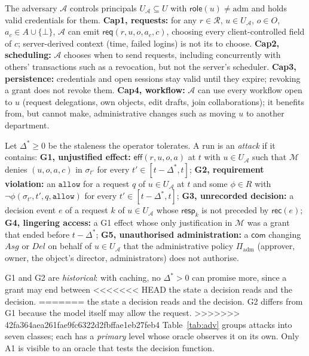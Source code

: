\documentclass[sigconf,review,anonymous]{acmart}
\newcommand{\role}{\mathsf{role}}
\newcommand{\allowv}{\mathtt{allow}}
\newcommand{\ev}[1]{\mathsf{#1}}
\newcommand{\Routes}{\mathcal{R}}
\begin{document}
\begin{definition}[Adversary]\label{def:adv}
The adversary $\mathcal{A}$ controls principals $U_{\mathcal{A}}\subseteq U$ with $\role(u)\neq\mathrm{adm}$ and
holds valid credentials for them. \textbf{Cap1, requests:} for any $r\in\Routes$, $u\in U_{\mathcal{A}}$, $o\in O$,
$a_c\in A\cup\{\bot\}$, $\mathcal{A}$ can emit $\ev{req}(r,u,o,a_c,c)$, choosing every client-controlled field of
$c$; server-derived context (time, failed logins) is not its to choose. \textbf{Cap2, scheduling:} $\mathcal{A}$
chooses when to send requests, including concurrently with others' transactions such as a revocation, but not the
server's scheduler. \textbf{Cap3, persistence:} credentials and open sessions stay valid until they expire;
revoking a grant does not revoke them. \textbf{Cap4, workflow:} $\mathcal{A}$ can use every workflow open to $u$
(request delegations, own objects, edit drafts, join collaborations); it benefits from, but cannot make,
administrative changes such as moving $u$ to another department.
\end{definition}

\begin{definition}\label{def:goals}
Let $\Delta^\ast\ge0$ be the staleness the operator tolerates. A run is an \emph{attack} if it contains:
\textbf{G1, unjustified effect:} $\ev{eff}(r,u,o,a)$ at $t$ with $u\in U_{\mathcal{A}}$ such that $\mathcal{M}$
denies $(u,o,a,c)$ in $\sigma_{t'}$ for every $t'\in[t-\Delta^\ast,t]$;
\textbf{G2, requirement violation:} an $\allowv$ for a request $q$ of $u\in U_{\mathcal{A}}$ at $t$ and some
$\phi\in R$ with $\neg\phi(\sigma_{t'},t',q,\allowv)$ for every $t'\in[t-\Delta^\ast,t]$;
\textbf{G3, unrecorded decision:} a decision event $e$ of a request $k$ of $u\in U_{\mathcal{A}}$ whose
$\ev{resp}_k$ is not preceded by $\ev{rec}(e)$;
\textbf{G4, lingering access:} a G1 effect whose only justification in $\mathcal{M}$ was a grant that ended before
$t-\Delta^\ast$;
\textbf{G5, unauthorised administration:} a $\ev{com}$ changing $\mathit{Asg}$ or $\mathit{Del}$ on behalf of
$u\in U_{\mathcal{A}}$ that the administrative policy $\Pi_{\mathrm{adm}}$ (approver, owner, the object's director,
administrators) does not authorise.
\end{definition}

G1 and G2 are \emph{historical}: with caching, no $\Delta^\ast>0$ can promise more, since a grant may end between
<<<<<<< HEAD
the state a decision reads and the decision.
=======
the state a decision reads and the decision. G2 differs from G1 because the model itself may allow the request.
>>>>>>> 42fa364aea261fae9fc6322d2fbffae1eb27feb4
Table~\ref{tab:adv} groups attacks into seven classes; each has a \emph{primary} level whose oracle observes it on
its own. Only A1 is visible to an oracle that tests the decision function.
\end{document}
